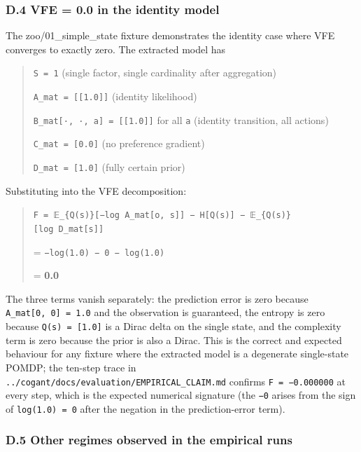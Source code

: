 \documentclass[
]{article}
\begin{document}
\subsubsection{D.4 VFE = 0.0 in the identity
model}\label{d.4-vfe-0.0-in-the-identity-model}

The zoo/01\_simple\_state fixture demonstrates the identity case where
VFE converges to exactly zero. The extracted model has

\begin{quote}
\texttt{\mid{}S\mid{}\ =\ 1} (single factor, single cardinality
after aggregation)

\texttt{A\_mat\ =\ {[}{[}1.0{]}{]}} (identity likelihood)

\texttt{B\_mat{[}·,\ ·,\ a{]}\ =\ {[}{[}1.0{]}{]}} for all \texttt{a}
(identity transition, all actions)

\texttt{C\_mat\ =\ {[}0.0{]}} (no preference gradient)

\texttt{D\_mat\ =\ {[}1.0{]}} (fully certain prior)
\end{quote}

Substituting into the VFE decomposition:

\begin{quote}
\texttt{F\ =\ 𝔼\_\{Q(s)\}{[}−log\ A\_mat{[}o,\ s{]}{]}\ −\ H{[}Q(s){]}\ −\ 𝔼\_\{Q(s)\}{[}log\ D\_mat{[}s{]}{]}}

= \texttt{−log(1.0)\ −\ 0\ −\ log(1.0)}

= \textbf{0.0}
\end{quote}

The three terms vanish separately: the prediction error is zero because
\texttt{A\_mat{[}0,\ 0{]}\ =\ 1.0} and the observation is guaranteed,
the entropy is zero because \texttt{Q(s)\ =\ {[}1.0{]}} is a Dirac delta
on the single state, and the complexity term is zero because the prior
is also a Dirac. This is the correct and expected behaviour for any
fixture where the extracted model is a degenerate single-state POMDP;
the ten-step trace in
\texttt{../cogant/docs/evaluation/EMPIRICAL\_CLAIM.md} confirms
\texttt{F\ =\ −0.000000} at every step, which is the expected numerical
signature (the \texttt{−0} arises from the sign of
\texttt{log(1.0)\ =\ 0} after the negation in the prediction-error
term).

\subsubsection{D.5 Other regimes observed in the empirical
runs}\label{d.5-other-regimes-observed-in-the-empirical-runs}
\end{document}
